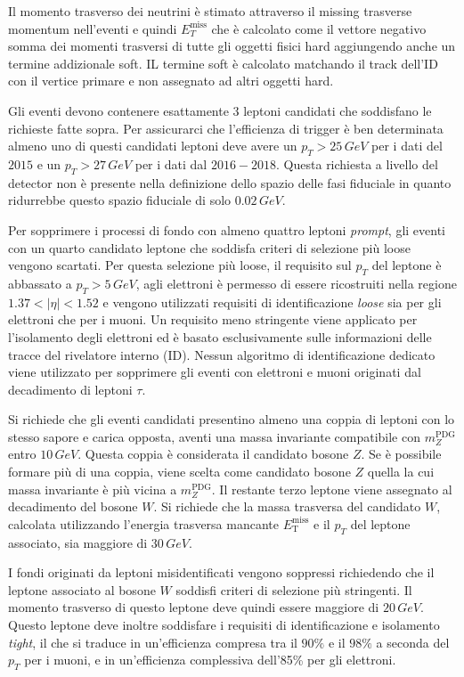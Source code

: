 \documentclass[11pt]{article}
\begin{document}
Il momento trasverso dei neutrini è stimato attraverso il missing trasverse momentum nell'eventi e quindi $E_T^\text{miss}$ che è calcolato come il vettore negativo somma dei momenti trasversi di tutte gli oggetti fisici hard aggiungendo anche un termine addizionale soft. IL termine soft è calcolato matchando il track dell'ID con il vertice primare e non assegnato ad altri oggetti hard.

Gli eventi devono contenere esattamente $3$ leptoni candidati che soddisfano le richieste fatte sopra. Per assicurarci che l'efficienza di trigger è ben determinata almeno uno di questi candidati leptoni deve avere un $p_T>25\,\unit{GeV}$ per i dati del $2015$ e un $p_T>27\,\unit{GeV}$ per i dati dal $2016-2018$. Questa richiesta a livello del detector non è presente nella definizione dello spazio delle fasi fiduciale in quanto ridurrebbe questo spazio fiduciale di solo $0.02\,\unit{GeV}$.

Per sopprimere i processi di fondo con almeno quattro leptoni \textit{prompt}, gli eventi con un quarto candidato leptone che soddisfa criteri di selezione più loose vengono scartati. Per questa selezione più loose, il requisito sul $p_T$ del leptone è abbassato a $p_T > 5\,\unit{GeV}$, agli elettroni è permesso di essere ricostruiti nella regione $1.37 < |\eta| < 1.52$ e vengono utilizzati requisiti di identificazione \textit{loose} sia per gli elettroni che per i muoni. Un requisito meno stringente viene applicato per l'isolamento degli elettroni ed è basato esclusivamente sulle informazioni delle tracce del rivelatore interno (ID). Nessun algoritmo di identificazione dedicato viene utilizzato per sopprimere gli eventi con elettroni e muoni originati dal decadimento di leptoni $\tau$.

Si richiede che gli eventi candidati presentino almeno una coppia di leptoni con lo stesso sapore e carica opposta, aventi una massa invariante compatibile con $m_Z^{\mathrm{PDG}}$ entro $10\,\unit{GeV}$. Questa coppia è considerata il candidato bosone $Z$. Se è possibile formare più di una coppia, viene scelta come candidato bosone $Z$ quella la cui massa invariante è più vicina a $m_Z^{\mathrm{PDG}}$. Il restante terzo leptone viene assegnato al decadimento del bosone $W$. Si richiede che la massa trasversa del candidato $W$, calcolata utilizzando l'energia trasversa mancante $E_{\mathrm{T}}^{\mathrm{miss}}$ e il $p_T$ del leptone associato, sia maggiore di $30\,\unit{GeV}$.

I fondi originati da leptoni misidentificati vengono soppressi richiedendo che il leptone associato al bosone $W$ soddisfi criteri di selezione più stringenti. Il momento trasverso di questo leptone deve quindi essere maggiore di $20\,\unit{GeV}$. Questo leptone deve inoltre soddisfare i requisiti di identificazione e isolamento \textit{tight}, il che si traduce in un'efficienza compresa tra il $90\%$ e il $98\%$ a seconda del $p_T$ per i muoni, e in un'efficienza complessiva dell'85\% per gli elettroni.
\end{document}
